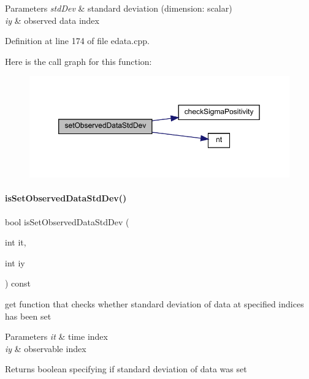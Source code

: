 \begin{DoxyParams}{Parameters}
{\em std\+Dev} & standard deviation (dimension\+: scalar) \\
\hline
{\em iy} & observed data index \\
\hline
\end{DoxyParams}


Definition at line 174 of file edata.\+cpp.

Here is the call graph for this function\+:
\nopagebreak
\begin{figure}[H]
\begin{center}
\leavevmode
\includegraphics[width=350pt]{classamici_1_1_exp_data_a10c64e99f5f3a2b19e3944b69b0d69ff_cgraph}
\end{center}
\end{figure}
\mbox{\label{classamici_1_1_exp_data_a75808a32f77afa60bb736a1dfbce9aba}} 
\paragraph{\texorpdfstring{is\+Set\+Observed\+Data\+Std\+Dev()}{isSetObservedDataStdDev()}}
{\footnotesize\ttfamily bool is\+Set\+Observed\+Data\+Std\+Dev (\begin{DoxyParamCaption}\item[{int}]{it,  }\item[{int}]{iy }\end{DoxyParamCaption}) const}

get function that checks whether standard deviation of data at specified indices has been set


\begin{DoxyParams}{Parameters}
{\em it} & time index \\
\hline
{\em iy} & observable index \\
\hline
\end{DoxyParams}
\begin{DoxyReturn}{Returns}
boolean specifying if standard deviation of data was set 
\end{DoxyReturn}


